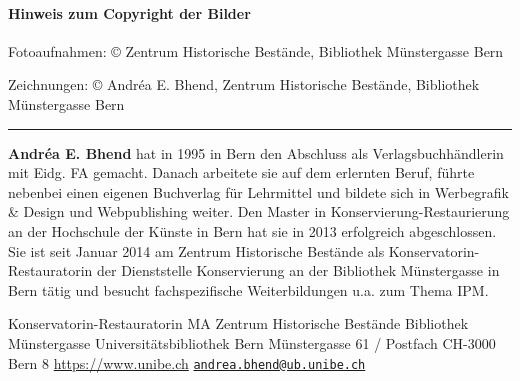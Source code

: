 \documentclass[a4paper,
fontsize=11pt,
oneside,
numbers=noperiodatend,
parskip=half-,
bibliography=totoc,
final
]{scrartcl}
\begin{document}
\hypertarget{hinweis-zum-copyright-der-bilder}{%
\paragraph{Hinweis zum Copyright der
Bilder}\label{hinweis-zum-copyright-der-bilder}}

Fotoaufnahmen: © Zentrum Historische Bestände, Bibliothek Münstergasse
Bern

Zeichnungen: © Andréa E. Bhend, Zentrum Historische Bestände, Bibliothek
Münstergasse Bern

\begin{center}\rule{0.5\linewidth}{0.5pt}\end{center}

\textbf{Andréa E. Bhend} hat in 1995 in Bern den Abschluss als
Verlagsbuchhändlerin mit Eidg. FA gemacht. Danach arbeitete sie auf dem
erlernten Beruf, führte nebenbei einen eigenen Buchverlag für Lehrmittel
und bildete sich in Werbegrafik \& Design und Webpublishing weiter. Den
Master in Konservierung-Restaurierung an der Hochschule der Künste in
Bern hat sie in 2013 erfolgreich abgeschlossen. Sie ist seit Januar 2014
am Zentrum Historische Bestände als Konservatorin-Restauratorin der
Dienststelle Konservierung an der Bibliothek Münstergasse in Bern tätig
und besucht fachspezifische Weiterbildungen u.a. zum Thema IPM.

Konservatorin-Restauratorin MA Zentrum Historische Bestände Bibliothek
Münstergasse Universitätsbibliothek Bern Münstergasse 61 / Postfach
CH-3000 Bern 8 \url{https://www.unibe.ch} \textbar{}
\href{mailto:andrea.bhend@ub.unibe.ch}{\nolinkurl{andrea.bhend@ub.unibe.ch}}
\end{document}
